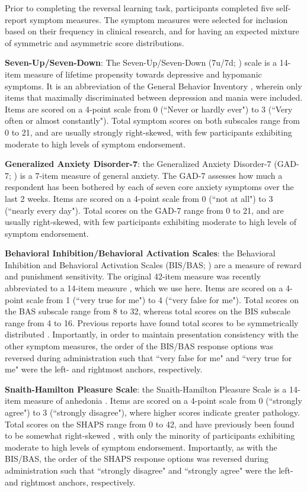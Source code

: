 \documentclass[a4paper,notitlepage,12pt]{article}
\begin{document}
\begin{refsection}[main]
Prior to completing the reversal learning task, participants completed five self-report symptom measures. The symptom measures were selected for inclusion based on their frequency in clinical research, and for having an expected mixture of symmetric and asymmetric score distributions. 

\textbf{Seven-Up/Seven-Down}: The Seven-Up/Seven-Down (7u/7d; \cite{youngstrom_2013_susd}) scale is a 14-item measure of lifetime propensity towards depressive and hypomanic symptoms. It is an abbreviation of the General Behavior Inventory \cite{depue1981behavioral}, wherein only items that maximally discriminated between depression and mania were included. Items are scored on a 4-point scale from 0 (``Never or hardly ever") to 3 (``Very often or almost constantly"). Total symptom scores on both subscales range from 0 to 21, and are usually strongly right-skewed, with few participants exhibiting moderate to high levels of symptom endorsement. 

\textbf{Generalized Anxiety Disorder-7}: the Generalized Anxiety Disorder-7 (GAD-7; \cite{spitzer2006brief}) is a 7-item measure of general anxiety. The GAD-7 assesses how much a respondent has been bothered by each of seven core anxiety symptoms over the last 2 weeks. Items are scored on a 4-point scale from 0 (``not at all") to 3 (``nearly every day"). Total scores on the GAD-7 range from 0 to 21, and are usually right-skewed, with few participants exhibiting moderate to high levels of symptom endorsement.

\textbf{Behavioral Inhibition/Behavioral Activation Scales}: the Behavioral Inhibition and Behavioral Activation Scales (BIS/BAS; \cite{carver1994behavioral}) are a measure of reward and punishment sensitivity. The original 42-item measure was recently abbreviated to a 14-item measure \cite{pagliaccio2016revising}, which we use here. Items are scored on a 4-point scale from 1 (``very true for me") to 4 (``very false for me"). Total scores on the BAS subscale range from 8 to 32, whereas total scores on the BIS subscale range from 4 to 16. Previous reports have found total scores to be symmetrically distributed \cite{cooper2007behavioural}. Importantly, in order to maintain presentation consistency with the other symptom measures, the order of the BIS/BAS response options was reversed during administration such that ``very false for me" and ``very true for me" were the left- and rightmost anchors, respectively. 

\textbf{Snaith-Hamilton Pleasure Scale}: the Snaith-Hamilton Pleasure Scale is a 14-item measure of anhedonia \cite{snaith1995scale}. Items are scored on a 4-point scale from 0 (``strongly agree") to 3 (``strongly disagree"), where higher scores indicate greater pathology. Total scores on the SHAPS range from 0 to 42, and have previously been found to be somewhat right-skewed \cite{franken2007assessment, leventhal2015measuring}, with only the minority of participants exhibiting moderate to high levels of symptom endorsement. Importantly, as with the BIS/BAS, the order of the SHAPS response options was reversed during administration such that ``strongly disagree" and ``strongly agree" were the left- and rightmost anchors, respectively.


\end{refsection}
\end{document}
